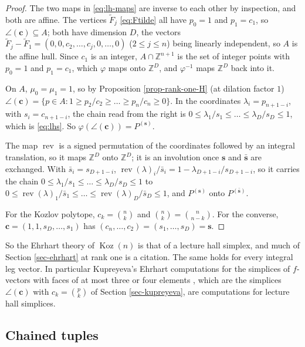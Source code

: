 \documentclass[11pt, a4paper, abstract=yes]{scrartcl}
\theoremstyle{definition}
\theoremstyle{remark}
\theoremstyle{plain}
\newcommand{\vek}[1]{\boldsymbol{#1}}
\theoremstyle{remark}
\theoremstyle{plain}
\newcommand{\Koz}{\operatorname{Koz}}
\newcommand{\rasimp}{\angle}
\let\autocite\cite
\begin{document}
\begin{proof}
The two maps in \eqref{eq:lh-maps} are inverse to each other by inspection, and both are affine.
The vertices \(\tilde F_j\) \eqref{eq:Ftilde} all have \(p_0=1\) and \(p_1=c_1\), so
\(\rasimp(\vek c)\subseteq A\); both have dimension \(D\), the vectors
\(\tilde F_j-\tilde F_1=(0,0,c_2,\dots,c_j,0,\dots,0)\) (\(2\le j\le n\)) being linearly independent, so
\(A\) is the affine hull. Since \(c_1\) is an integer, \(A\cap\mathbb Z^{n+1}\) is the set of integer
points with \(p_0=1\) and \(p_1=c_1\), which \(\varphi\) maps onto \(\mathbb Z^D\), and \(\varphi^{-1}\)
maps \(\mathbb Z^D\) back into it.

On \(A\), \(\mu_0=\mu_1=1\), so by Proposition \ref{prop-rank-one-H} (at dilation factor \(1\))
\(\rasimp(\vek c)=\lbrace p\in A:1\ge p_2/c_2\ge\dots\ge p_n/c_n\ge0\rbrace\). In the coordinates
\(\lambda_i=p_{n+1-i}\), with \(s_i=c_{n+1-i}\), the chain read from the right is
\(0\le\lambda_1/s_1\le\dots\le\lambda_D/s_D\le1\), which is \eqref{eq:lhs}. So
\(\varphi(\rasimp(\vek c))=P^{(\vek s)}\).

The map \(\operatorname{rev}\) is a signed permutation of the coordinates followed by an integral translation,
so it maps \(\mathbb Z^D\) onto \(\mathbb Z^D\); it is an involution once \(\vek s\) and
\(\bar{\vek s}\) are exchanged. With \(\bar s_i=s_{D+1-i}\),
\(\operatorname{rev}(\lambda)_i/\bar s_i=1-\lambda_{D+1-i}/s_{D+1-i}\), so it carries the chain
\(0\le\lambda_1/s_1\le\dots\le\lambda_D/s_D\le1\) to
\(0\le\operatorname{rev}(\lambda)_1/\bar s_1\le\dots\le\operatorname{rev}(\lambda)_D/\bar s_D\le1\), and \(P^{(\vek s)}\) onto
\(P^{(\bar{\vek s})}\).

For the Kozlov polytope, \(c_k=\binom nk\) and \(\binom nk=\binom n{n-k}\). For the converse,
\(\vek c=(1,1,s_D,\dots,s_1)\) has \((c_n,\dots,c_2)=(s_1,\dots,s_D)=\vek s\).
\end{proof}

So the Ehrhart theory of \(\Koz(n)\) is that of a lecture hall simplex, and much of
Section \ref{sec-ehrhart} at rank one is a citation. The same holds for every integral leg vector. In
particular Kupreyeva's Ehrhart computations for the simplices of \(f\)-vectors with faces of at most
three or four elements \autocite{Kupreyeva2019}, which are the simplices \(\rasimp(\vek c)\) with
\(c_k=\binom pk\) of Section \ref{sec-kupreyeva}, are computations for lecture hall simplices.
\subsection{Chained tuples}
\label{sec:org070e7e1}
\end{document}
